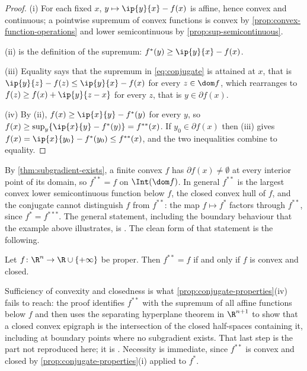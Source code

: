 \begin{proof}
	(i) For each fixed $x$, $y\mapsto\ip{y}{x}-f(x)$ is affine, hence convex and
	continuous; a pointwise supremum of convex functions is convex by
	\autoref{prop:convex-function-operations} and lower semicontinuous by
	\autoref{prop:sup-semicontinuous}.

	(ii) is the definition of the supremum: $f^{\ast}(y)\geq\ip{y}{x}-f(x)$.

	(iii) Equality says that the supremum in \eqref{eq:conjugate} is attained at
	$x$, that is $\ip{y}{z}-f(z)\leq\ip{y}{x}-f(x)$ for every $z\in\dom f$, which
	rearranges to $f(z)\geq f(x)+\ip{y}{z-x}$ for every $z$, that is
	$y\in\partial f(x)$.

	(iv) By (ii), $f(x)\geq\ip{x}{y}-f^{\ast}(y)$ for every $y$, so
	$f(x)\geq\sup_y\{\ip{x}{y}-f^{\ast}(y)\}=f^{\ast\ast}(x)$. If
	$y_0\in\partial f(x)$ then (iii) gives $f(x)=\ip{x}{y_0}-f^{\ast}(y_0)
		\leq f^{\ast\ast}(x)$, and the two inequalities combine to equality.
\end{proof}

By \autoref{thm:subgradient-exists}, a finite convex $f$ has
$\partial f(x)\neq\emptyset$ at every interior point of its domain, so
$f^{\ast\ast}=f$ on $\Int(\dom f)$. In general $f^{\ast\ast}$ is the largest
convex lower semicontinuous function below $f$, the closed convex hull of $f$,
and the conjugate cannot distinguish $f$ from $f^{\ast\ast}$: the map
$f\mapsto f^{\ast}$ factors through $f^{\ast\ast}$, since
$f^{\ast}=f^{\ast\ast\ast}$. The general statement, including the boundary
behaviour that the example above illustrates, is
\textcite[Sec.~3.3, p.~90]{boyd2004convex}. The clean form of that statement is
the following.

\begin{theorem}\label{thm:fenchel-moreau}
	Let $f\colon\R^n\to\R\cup\{+\infty\}$ be proper. Then $f^{\ast\ast}=f$ if and
	only if $f$ is convex and closed.
\end{theorem}

Sufficiency of convexity and closedness is what
\autoref{prop:conjugate-properties}(iv) fails to reach: the proof identifies
$f^{\ast\ast}$ with the supremum of all affine functions below $f$ and then uses
the separating hyperplane theorem in $\R^{n+1}$ to show that a closed convex
epigraph is the intersection of the closed half-spaces containing it, including
at boundary points where no subgradient exists. That last step is the part not
reproduced here; it is \textcite[Thm.~12.2]{rockafellar1970convex}. Necessity is
immediate, since $f^{\ast\ast}$ is convex and closed by
\autoref{prop:conjugate-properties}(i) applied to $f^{\ast}$.

